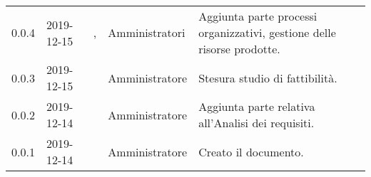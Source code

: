 {\begin{longtable}{C{2cm} C{2cm}  C{3cm}  C{3cm} C{4.5cm}}
0.0.4 & 2019-12-15 & \BR{}, \PF{}  & Amministratori & Aggiunta parte processi organizzativi, gestione delle risorse prodotte. \\

0.0.3 & 2019-12-15 & \MC{} & Amministratore & Stesura studio di fattibilità. \\

0.0.2 & 2019-12-14 & \CE{} & Amministratore & Aggiunta parte relativa all’Analisi dei requisiti. \\

0.0.1 & 2019-12-14 & \CE{} & Amministratore & Creato il documento. \\
		
\end{longtable}
}
